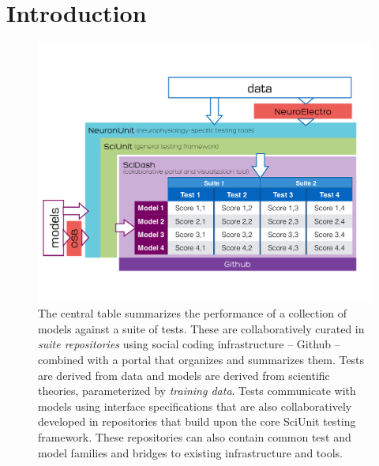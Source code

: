 \documentclass[9pt]{sig-alternate}
\begin{document}


%

\section{Introduction}
\begin{figure}[t]
\centering
\includegraphics[scale=0.4]{diagram1.pdf}
\vspace{-25px}
\caption{The central table summarizes the performance of a collection of models against a suite of tests. These are collaboratively curated in \emph{suite repositories} using social coding infrastructure -- Github -- combined with a portal that organizes and summarizes them. Tests are derived from data and models are derived from scientific theories, parameterized by \emph{training data}. Tests communicate with models using interface specifications that are also collaboratively developed in repositories that build upon the core SciUnit testing framework. These repositories can also contain common test and model families and bridges to existing infrastructure and tools.}  
\label{fig:sciunit_overview}
\end{figure}
\end{document}
